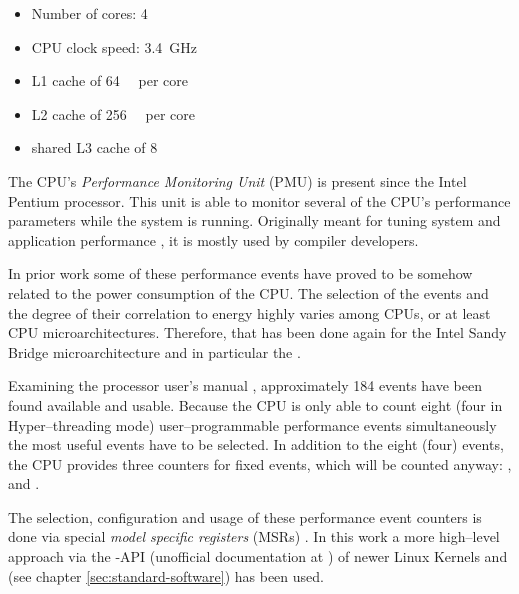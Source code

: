 \begin{itemize}

\item Number of cores: 4

\item CPU clock speed: \SI{3.4}{\giga\hertz}

\item L1 cache of \SI{64}{\kibi\byte} per core\cite{intel2011softdev1}

\item L2 cache of \SI{256}{\kibi\byte} per core\cite{intel2011softdev1}

\item shared L3 cache of \SI{8}{\mebi\byte}\cite{intel2011softdev1}

\end{itemize}


\label{sec:pmu}

The CPU's \emph{Performance Monitoring Unit} (PMU) is present since the
Intel\TReg{} Pentium processor. This unit is able to monitor several of the
CPU's performance parameters while the system is running. Originally meant for
tuning system and application performance \cite{intel2011softdev3b}, it is
mostly used by compiler developers.

In prior work \cite{bellosa2000benefits,snowdon2010operating,
weissel2002process,kellner03tempcontrol,bertran2010decomposable} some of these
performance events have proved to be somehow related to the power consumption of
the CPU. The selection of the events and the degree of their correlation to
energy highly varies among CPUs, or at least CPU microarchitectures.
Therefore, that has been done again for the Intel\TReg{} Sandy Bridge
microarchitecture and in particular the \JWPcpu{}.

Examining the processor user's manual \cite{intel2011events}, approximately 184
events have been found available and usable. Because the CPU is only able to
count eight (four in Hyper--threading \cite{wiki:HT} mode) user--programmable
performance events simultaneously \cite{intel2011softdev1} the most useful
events have to be selected. In addition to the eight (four) events, the CPU
provides three counters for fixed events, which will be counted anyway:
,  and
.

The selection, configuration and usage of these performance event counters is
done via special \emph{model specific registers} (MSRs)
\cite{intel2011softdev3b}. In this work a more high--level approach via the
-API (unofficial documentation at
\cite{weaver2011perfevents}) of newer Linux Kernels and \JWTlibpfm{} (see
chapter \ref{sec:standard-software}) has been used.


